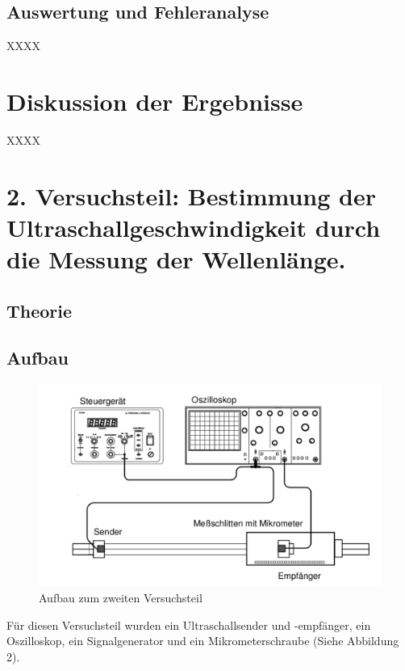 \documentclass[11pt,a4paper]{article}
\begin{document}
\subsection{Auswertung und Fehleranalyse}

XXXX

\section{Diskussion der Ergebnisse}

XXXX

\pagebreak

\section{2. Versuchsteil: Bestimmung der Ultraschallgeschwindigkeit durch die Messung der Wellenlänge.}
\subsection{Theorie}
\subsection{Aufbau}
\begin{figure}
	\centering
	\includegraphics[scale=0.5]{Abb2}
	\caption{Aufbau zum zweiten Versuchsteil}
\end{figure}

Für diesen Versuchsteil wurden ein Ultraschallsender und -empfänger, ein Oszilloskop, ein Signalgenerator und ein Mikrometerschraube (Siehe Abbildung 2). 
\end{document}
